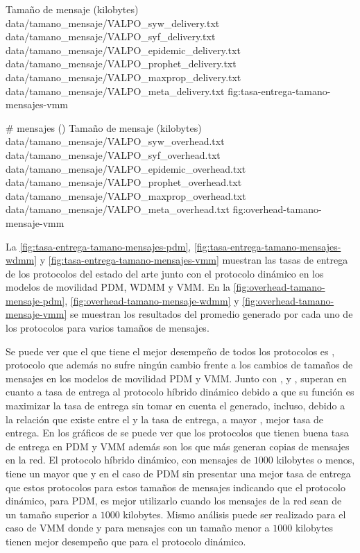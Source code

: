 {
\graficoDeliveryProtocolosTamano
{Tamaño de mensaje (kilobytes)}
{data/tamano_mensaje/VALPO_syw_delivery.txt}
{data/tamano_mensaje/VALPO_syf_delivery.txt}
{data/tamano_mensaje/VALPO_epidemic_delivery.txt}
{data/tamano_mensaje/VALPO_prophet_delivery.txt}
{data/tamano_mensaje/VALPO_maxprop_delivery.txt}
{data/tamano_mensaje/VALPO_meta_delivery.txt}
}{fig:tasa-entrega-tamano-mensajes-vmm}


{
\graficoProtocolosTamano
{\# mensajes (\overhead)}
{Tamaño de mensaje (kilobytes)}
{data/tamano_mensaje/VALPO_syw_overhead.txt}
{data/tamano_mensaje/VALPO_syf_overhead.txt}
{data/tamano_mensaje/VALPO_epidemic_overhead.txt}
{data/tamano_mensaje/VALPO_prophet_overhead.txt}
{data/tamano_mensaje/VALPO_maxprop_overhead.txt}
{data/tamano_mensaje/VALPO_meta_overhead.txt}
}{fig:overhead-tamano-mensaje-vmm}


La \ref{fig:tasa-entrega-tamano-mensajes-pdm},
\ref{fig:tasa-entrega-tamano-mensajes-wdmm} y 
\ref{fig:tasa-entrega-tamano-mensajes-vmm} muestran las tasas de entrega de los
protocolos del estado del arte junto con el protocolo dinámico en los modelos de
movilidad PDM, WDMM y VMM. En la \ref{fig:overhead-tamano-mensaje-pdm},
\ref{fig:overhead-tamano-mensaje-wdmm} y \ref{fig:overhead-tamano-mensaje-vmm}
se muestran los resultados del \overhead{} promedio generado por cada uno de los
protocolos para varios tamaños de mensajes. 

Se puede ver que el que tiene el mejor desempeño de todos los protocolos es
\maxprop, protocolo que además no sufre ningún cambio frente a los cambios de
tamaños de mensajes en los modelos de movilidad PDM y VMM. Junto con \syf,
\epidemic{} y \prophet{}, superan en cuanto a tasa de entrega al protocolo
híbrido dinámico debido a que su función es maximizar la tasa de entrega sin
tomar en cuenta el \overhead{} generado, incluso, debido a la relación que
existe entre el \overhead{} y la tasa de entrega, a mayor \overhead{}, mejor
tasa de entrega. En los gráficos de \overhead{} se puede ver que los protocolos
que tienen buena tasa de entrega en PDM y VMM además son los que más generan
copias de mensajes en la red. El protocolo híbrido dinámico, con mensajes de
$1000$ kilobytes o menos, tiene un \overhead{} mayor que \epidemic{} y
\prophet{} en el caso de PDM sin presentar una mejor tasa de entrega que estos
protocolos para estos tamaños de mensajes indicando que el protocolo dinámico,
para PDM, es mejor utilizarlo cuando los mensajes de la red sean de un tamaño
superior a $1000$ kilobytes. Mismo análisis puede ser realizado para el caso de
VMM donde \epidemic{} y \prophet{} para mensajes con un tamaño menor a $1000$
kilobytes tienen mejor desempeño que para el protocolo dinámico.

